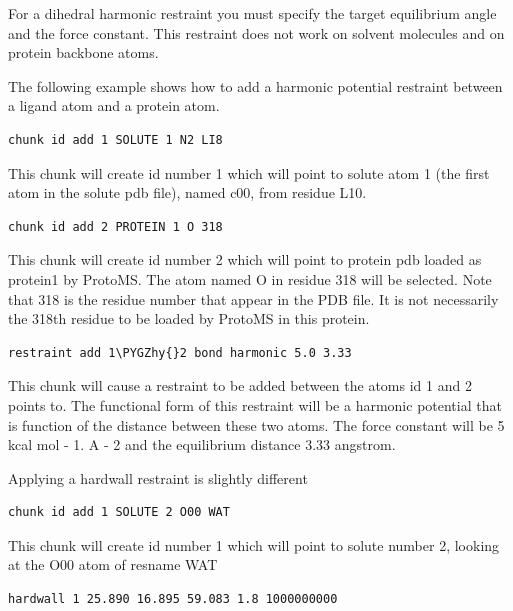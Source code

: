 \documentclass[letterpaper,10pt,english]{sphinxmanual}
\def\PYGZhy{\char`\-}
\begin{document}
For a dihedral harmonic restraint you must specify the target equilibrium angle and the force constant. This restraint does not work on solvent molecules and on protein backbone atoms.

The following example shows how to add a harmonic potential restraint between a ligand atom and a protein atom.

\begin{Verbatim}[commandchars=\\\{\}]
chunk id add 1 SOLUTE 1 N2 LI8
\end{Verbatim}

This chunk will create id number 1 which will point to solute atom 1 (the first atom in the solute pdb file), named c00, from residue L10.

\begin{Verbatim}[commandchars=\\\{\}]
chunk id add 2 PROTEIN 1 O 318
\end{Verbatim}

This chunk will create id number 2 which will point to protein pdb loaded as protein1 by ProtoMS. The atom named O in residue 318 will be selected. Note that 318 is the residue number that appear in the PDB file. It is not necessarily the 318th residue to be loaded by ProtoMS in this protein.

\begin{Verbatim}[commandchars=\\\{\}]
restraint add 1\PYGZhy{}2 bond harmonic 5.0 3.33
\end{Verbatim}

This chunk will cause a restraint to be added between the atoms id 1 and 2 points to. The functional form of this restraint will be a harmonic potential that is function of the distance between these two atoms. The force constant will be 5 kcal mol - 1. A - 2 and the equilibrium distance 3.33 angstrom.

Applying a hardwall restraint is slightly different

\begin{Verbatim}[commandchars=\\\{\}]
chunk id add 1 SOLUTE 2 O00 WAT
\end{Verbatim}

This chunk will create id number 1 which will point to solute number 2, looking at the O00 atom of resname WAT

\begin{Verbatim}[commandchars=\\\{\}]
hardwall 1 25.890 16.895 59.083 1.8 1000000000
\end{Verbatim}
\end{document}
